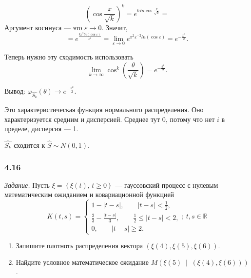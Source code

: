 $$ \left( \cos \frac{x}{ \sqrt{k}} \right)^k =
  e^{k \, ln \cos \frac{x}{ \sqrt{k}}} =$$
Аргумент косинуса --- это $ \varepsilon \to 0$.
Значит,
$$= e^{ \frac{k \varepsilon^2 ln \left( \cos \varepsilon \right) }{ \varepsilon^2}} =
  \lim \limits_{ \varepsilon \to 0} e^{x^2 \varepsilon^{-2} ln \left( \cos \varepsilon \right) } =
  e^{-\frac{x^2}{2}}.$$

Теперь нужно эту сходимость использовать
$$ \lim \limits_{k \to \infty } \cos^k \left( \frac{ \theta }{ \sqrt{k}} \right) =
  e^{-\frac{ \theta^2}{2}}.$$

Вывод: $ \varphi_{ \hat{S_k}} \left( \theta \right) \to e^{-\frac{ \theta^2}{2}}$.

Это характеристическая функция нормального распределения.
Оно характеризуется средним и дисперсией.
Среднее тут 0, потому что нет $i$ в пределе, дисперсия --- 1.

$ \hat{S_k}$ сходится к $ \hat{S} \sim N \left( 0, 1 \right) $.

\subsubsection*{4.16}

\textit{Задание.}
Пусть $ \xi = \left\{ \xi \left( t \right), \, t \geq 0 \right\} $ ---
гауссовский процесс с нулевым математическим ожиданием и ковариационной функцией
$$K \left( t, s \right) =
  \begin{cases}
    1 - \left| t - s \right|, \qquad \left| t - s \right| < \frac{1}{2}, \\
    \frac{2}{3} - \frac{ \left| t - s \right| }{3}, \qquad
    \frac{1}{2} \leq \left| t - s \right| < 2, \\
    0, \qquad \left| t - s \right| \geq 2.
  \end{cases}; \, t, s \in \mathbb{R}$$
\begin{enumerate}[label=\alph*)]
  \item Запишите плотноть распределения вектора
  $ \left( \xi \left( 4 \right), \xi \left( 5 \right), \xi \left( 6 \right) \right) $.
  \item Найдите условное математическое ожидание
  $M \left(
    \xi \left( 5 \right) \; \middle| \; \left( \xi \left( 4 \right), \xi \left( 6 \right) \right)
  \right) $.
\end{enumerate}

